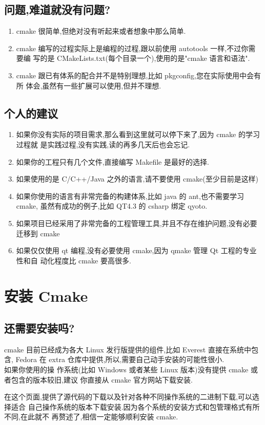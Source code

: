 \documentclass[oneside, 12pt]{book}
\begin{document}
\section{问题,难道就没有问题?}
\begin{enumerate}
  \item cmake 很简单,但绝对没有听起来或者想象中那么简单.

  \item cmake 编写的过程实际上是编程的过程,跟以前使用 autotools 一样,不过你需要编 写的是 CMakeLists.txt(每个目录一个),使用的是"cmake 语言和语法".

  \item cmake 跟已有体系的配合并不是特别理想,比如 pkgconfig,您在实际使用中会有所 体会,虽然有一些扩展可以使用,但并不理想.
\end{enumerate}
\section{个人的建议}
\begin{enumerate}
  \item 如果你没有实际的项目需求,那么看到这里就可以停下来了,因为 cmake 的学习过程就 是实践过程,没有实践,读的再多几天后也会忘记.

  \item 如果你的工程只有几个文件,直接编写 Makefile 是最好的选择.

  \item 如果使用的是 C/C++/Java 之外的语言,请不要使用 cmake(至少目前是这样)

  \item 如果你使用的语言有非常完备的构建体系,比如 java 的 ant,也不需要学习 cmake, 虽然有成功的例子,比如 QT4.3 的 csharp 绑定 qyoto.
  \item 如果项目已经采用了非常完备的工程管理工具,并且不存在维护问题,没有必要迁移到 cmake 
  \item 如果仅仅使用 qt 编程,没有必要使用 cmake,因为 qmake 管理 Qt 工程的专业性和自 动化程度比 cmake 要高很多.
\end{enumerate}
\chapter{安装 Cmake}
\section{还需要安装吗?}
cmake 目前已经成为各大 Linux 发行版提供的组件,比如 Everest 直接在系统中包含, Fedora 在 extra 仓库中提供,所以,需要自己动手安装的可能性很小.\\
如果你使用的操 作系统(比如 Windows 或者某些 Linux 版本)没有提供 cmake 或者包含的版本较旧,建议 你直接从 cmake 官方网站下载安装.
\begin{center}
  \par
\end{center}
在这个页面,提供了源代码的下载以及针对各种不同操作系统的二进制下载,可以选择适合 自己操作系统的版本下载安装.因为各个系统的安装方式和包管理格式有所不同,在此就不 再赘述了,相信一定能够顺利安装 cmake.
\end{document}
